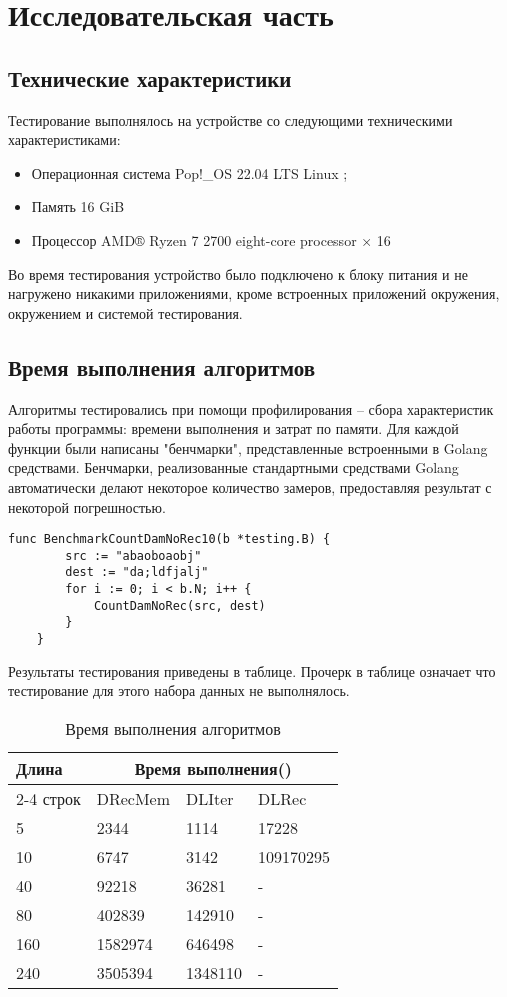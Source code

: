\chapter{Исследовательская часть}
\section{Технические характеристики}
Тестирование выполнялось на устройстве со следующими техническими характеристиками:
\begin{itemize}
	\item Операционная система Pop!\_OS 22.04 LTS \cite{ubuntu} Linux \cite{linux};
	\item Память 16 GiB
	\item Процессор AMD® Ryzen 7 2700 eight-core processor × 16 \cite{amd}
\end{itemize}
Во время тестирования устройство было подключено к блоку питания и не нагружено никакими приложениями, кроме встроенных приложений окружения, окружением и системой тестирования.
\section{Время выполнения алгоритмов}
Алгоритмы тестировались при помощи профилирования -- сбора характеристик работы программы: времени выполнения и затрат по памяти. Для каждой функции были написаны "бенчмарки"\cite{test}, представленные встроенными в Golang средствами. Бенчмарки, реализованные стандартными средствами Golang автоматически делают некоторое количество замеров, предоставляя результат с некоторой погрешностью.
\begin{lstlisting}[label=bench,caption=Пример бенчмарка]
	func BenchmarkCountDamNoRec10(b *testing.B) {
		src := "abaoboaobj"
		dest := "da;ldfjalj"
		for i := 0; i < b.N; i++ {
			CountDamNoRec(src, dest)
		}
	}
\end{lstlisting}
Результаты тестирования приведены в таблице. Прочерк в таблице означает что тестирование для этого набора данных не выполнялось.


\begin{table}[h!]
	\begin{center}
		\caption{Время выполнения алгоритмов}
		\begin{tabular}{ ||p{1.5cm}||p{2cm}|p{2cm}|p{3.5cm}||  }
			\hline
			\multirow{2}{*}{Длина}& \multicolumn{3}{c||}{Время выполнения()} \\[1.5ex]
			\cline{2-4} 
			строк& DRecMem & DLIter & DLRec \\ [1.5ex] 
			\hline\hline
			5  & 2344 & 1114 & 17228 \\
			10 & 6747 & 3142 & 109170295 \\
			40 & 92218 & 36281 & - \\
			80 & 402839 & 142910 & - \\
			160 & 1582974 & 646498 & - \\
			240 & 3505394 & 1348110 & - \\
			\hline
		\end{tabular}
		\label{time-table}
	\end{center}
\end{table}

